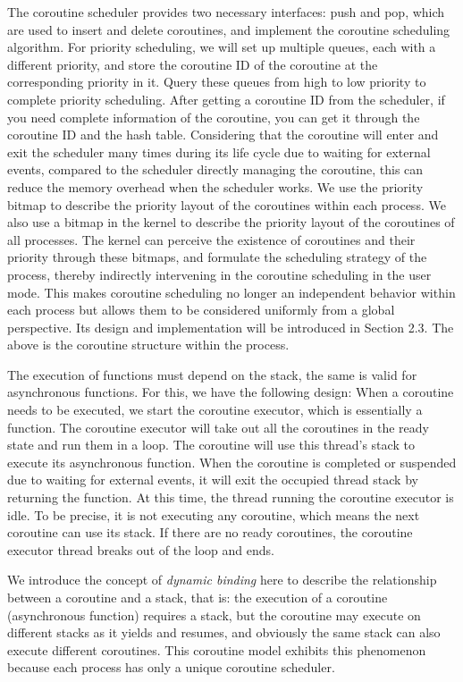 \documentclass[10pt]{article}
\begin{document}
The coroutine scheduler provides two necessary interfaces: push and pop, which are used to insert and delete coroutines, and implement the coroutine scheduling algorithm. For priority scheduling, we will set up multiple queues, each with a different priority, and store the coroutine ID of the coroutine at the corresponding priority in it. Query these queues from high to low priority to complete priority scheduling. After getting a coroutine ID from the scheduler, if you need complete information of the coroutine, you can get it through the coroutine ID and the hash table. Considering that the coroutine will enter and exit the scheduler many times during its life cycle due to waiting for external events, compared to the scheduler directly managing the coroutine, this can reduce the memory overhead when the scheduler works. We use the priority bitmap to describe the priority layout of the coroutines within each process. We also use a bitmap in the kernel to describe the priority layout of the coroutines of all processes. The kernel can perceive the existence of coroutines and their priority through these bitmaps, and formulate the scheduling strategy of the process, thereby indirectly intervening in the coroutine scheduling in the user mode. This makes coroutine scheduling no longer an independent behavior within each process but allows them to be considered uniformly from a global perspective. Its design and implementation will be introduced in Section 2.3. The above is the coroutine structure within the process.

The execution of functions must depend on the stack, the same is valid for asynchronous functions. For this, we have the following design: When a coroutine needs to be executed, we start the coroutine executor, which is essentially a function. The coroutine executor will take out all the coroutines in the ready state and run them in a loop. The coroutine will use this thread's stack to execute its asynchronous function. When the coroutine is completed or suspended due to waiting for external events, it will exit the occupied thread stack by returning the function. At this time, the thread running the coroutine executor is idle. To be precise, it is not executing any coroutine, which means the next coroutine can use its stack. If there are no ready coroutines, the coroutine executor thread breaks out of the loop and ends.

We introduce the concept of \textit{dynamic binding} here to describe the relationship between a coroutine and a stack, that is: the execution of a coroutine (asynchronous function) requires a stack, but the coroutine may execute on different stacks as it yields and resumes, and obviously the same stack can also execute different coroutines. This coroutine model exhibits this phenomenon because each process has only a unique coroutine scheduler.
\end{document}

